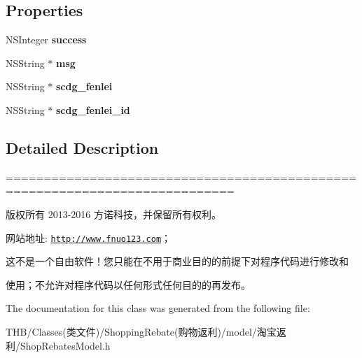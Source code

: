 \subsection*{Properties}
\begin{DoxyCompactItemize}
\item 
\mbox{\label{interface_shop_rebates_model_a28824f952b33eaf5b72cb4108b49bb63}} 
N\+S\+Integer {\bfseries success}
\item 
\mbox{\label{interface_shop_rebates_model_aaadc2005242c2d7bb68a460cc5f96ed0}} 
N\+S\+String $\ast$ {\bfseries msg}
\item 
\mbox{\label{interface_shop_rebates_model_aae2c386cf94b38704ff299a289b1698d}} 
N\+S\+String $\ast$ {\bfseries scdg\+\_\+fenlei}
\item 
\mbox{\label{interface_shop_rebates_model_af5fe1f404122ffaf0e8826c7ce906dea}} 
N\+S\+String $\ast$ {\bfseries scdg\+\_\+fenlei\+\_\+id}
\end{DoxyCompactItemize}


\subsection{Detailed Description}
============================================================================

版权所有 2013-\/2016 方诺科技，并保留所有权利。

网站地址\+: \href{http://www.fnuo123.com}{\tt http\+://www.\+fnuo123.\+com}； 



这不是一个自由软件！您只能在不用于商业目的的前提下对程序代码进行修改和

使用；不允许对程序代码以任何形式任何目的的再发布。 

 

The documentation for this class was generated from the following file\+:\begin{DoxyCompactItemize}
\item 
T\+H\+B/\+Classes(类文件)/\+Shopping\+Rebate(购物返利)/model/淘宝返利/Shop\+Rebates\+Model.\+h\end{DoxyCompactItemize}

